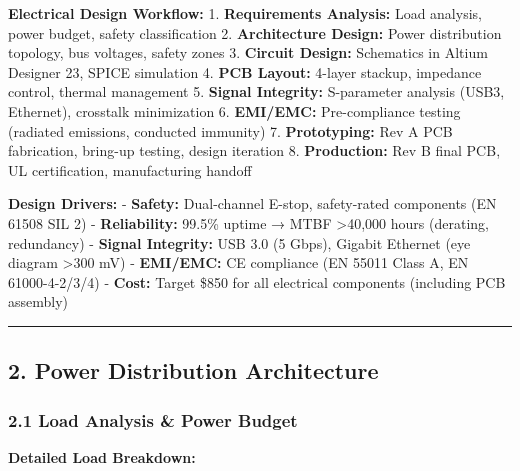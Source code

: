 \documentclass[
]{article}
\begin{document}
\textbf{Electrical Design Workflow:} 1. \textbf{Requirements Analysis:}
Load analysis, power budget, safety classification 2.
\textbf{Architecture Design:} Power distribution topology, bus voltages,
safety zones 3. \textbf{Circuit Design:} Schematics in Altium Designer
23, SPICE simulation 4. \textbf{PCB Layout:} 4-layer stackup, impedance
control, thermal management 5. \textbf{Signal Integrity:} S-parameter
analysis (USB3, Ethernet), crosstalk minimization 6. \textbf{EMI/EMC:}
Pre-compliance testing (radiated emissions, conducted immunity) 7.
\textbf{Prototyping:} Rev A PCB fabrication, bring-up testing, design
iteration 8. \textbf{Production:} Rev B final PCB, UL certification,
manufacturing handoff

\textbf{Design Drivers:} - \textbf{Safety:} Dual-channel E-stop,
safety-rated components (EN 61508 SIL 2) - \textbf{Reliability:} 99.5\%
uptime → MTBF \textgreater40,000 hours (derating, redundancy) -
\textbf{Signal Integrity:} USB 3.0 (5 Gbps), Gigabit Ethernet (eye
diagram \textgreater300 mV) - \textbf{EMI/EMC:} CE compliance (EN 55011
Class A, EN 61000-4-2/3/4) - \textbf{Cost:} Target \$850 for all
electrical components (including PCB assembly)

\begin{center}\rule{0.5\linewidth}{0.5pt}\end{center}

\hypertarget{power-distribution-architecture}{%
\subsection{2. Power Distribution
Architecture}\label{power-distribution-architecture}}

\hypertarget{load-analysis-power-budget}{%
\subsubsection{2.1 Load Analysis \& Power
Budget}\label{load-analysis-power-budget}}

\textbf{Detailed Load Breakdown:}
\end{document}
